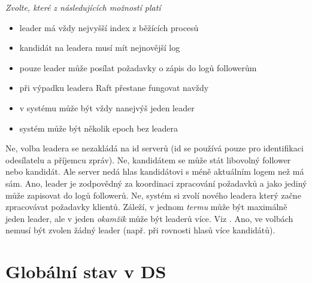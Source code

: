 \documentclass[usenames,dvipsnames,9pt]{beamer}
\begin{document}
{\begin{frame}[fragile]
\vspace{1em}

{\em Zvolte, které z následujících možností platí}

\begin{itemize}
\item leader má vždy nejvyšší index z běžících procesů 
\item kandidát na leadera musí mít nejnovější log  
\item pouze leader může posílat požadavky o zápis do logů followerům 
\item při výpadku leadera Raft přestane fungovat navždy 
\item v systému může být vždy nanejvýš jeden leader 
\item systém může být několik epoch bez leadera 
\end{itemize}
\vspace{1em}
\begin{overprint}[\textwidth]
   Ne, volba leadera se nezakládá na id serverů (id se používá pouze pro identifikaci odesílatelu a příjemcu zpráv).
   Ne, kandidátem se může stát libovolný follower nebo kandidát. Ale server nedá hlas kandidátovi s méně aktuálním logem než má sám. 
   Ano, leader je zodpovědný za koordinaci zpracování požadavků a jako jediný může zapisovat do logů followerů. 
   Ne, systém si zvolí nového leadera který začne zpracovávat požadavky klientů. 
   Záleží, v jednom \emph{termu} může být maximálně jeden leader, ale v jeden \emph{okamžik} může být leaderů více. Viz \href{http://thesecretlivesofdata.com/raft/}{}.
   Ano, ve volbách nemusí být zvolen žádný leader (např. při rovnosti hlasů více kandidátů).
\end{overprint}
\end{frame}
}

\section{Globální stav v DS}
\end{document}
